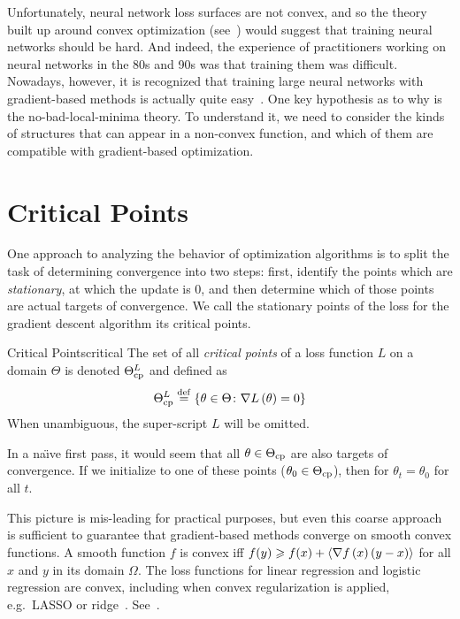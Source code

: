 \documentclass[../../thesis.tex]{subfiles}
\begin{document}
Unfortunately,
neural network loss surfaces are not convex,
and so the theory built up around convex optimization
(see~\cite{bubeck2015,boyd2004})
would suggest that training neural networks should be hard.
And indeed, the experience of practitioners
working on neural networks in the 80s and 90s
was that training them was difficult.
Nowadays, however,
it is recognized that training large neural networks
with gradient-based methods
is actually quite easy~\cite{sun2019}.
One key hypothesis as to why is the
no-bad-local-minima theory.
To understand it,
we need to consider the kinds of structures
that can appear in a non-convex function,
and which of them are compatible with gradient-based optimization.

\section{Critical Points}

One approach to analyzing the behavior of optimization algorithms
is to split the task of determining convergence
into two steps:
first, identify the points which are \emph{stationary},
at which the update is $0$,
and then determine which of those points are actual targets of convergence.
We call the stationary points of the loss
for the gradient descent algorithm its critical points.
\begin{definition}{Critical Points}{critical}
	The set of all \emph{critical points} of a loss function $L$
	on a domain $\Theta$ is denoted $\Theta^L_{\mathrm{cp}}$ and defined as
	\begin{equation}\equationlabel{def-thetacp}
		\Theta^L_{\cp} \defeq \Set{\theta \in \Theta \suchthat \grad{L}{\theta} = 0}
	\end{equation}
	When unambiguous, the super-script $L$ will be omitted.
\end{definition}
In a na{\"\i}ve first pass,
it would seem that all $\theta \in \Theta_{\mathrm{cp}}$
are also targets of convergence.
If we initialize  to one of these points
($\theta_{0} \in \Theta_{\mathrm{cp}}$),
then for $\theta_t = \theta_0$ for all $t$.

This picture is mis-leading for practical purposes,
but even this coarse approach is sufficient to guarantee
that gradient-based methods converge on smooth convex functions.
A smooth function $f$ is convex iff
$f(y) \geqslant f(x) + \langle\nabla f\left(x\right)(y - x)\rangle$
for all $x$ and $y$ in its domain $\Omega$.
The loss functions for linear regression and
logistic regression are convex,
including when convex regularization is applied,
e.g.~LASSO or ridge~\cite{hastie2016}.
See~.
\end{document}
